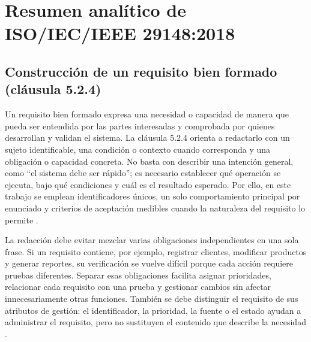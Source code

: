 \documentclass[11pt,a4paper]{article}
\begin{document}
\section{Resumen analítico de ISO/IEC/IEEE 29148:2018}

\subsection{Construcción de un requisito bien formado (cláusula 5.2.4)}
Un requisito bien formado expresa una necesidad o capacidad de manera que pueda ser entendida por las partes interesadas y comprobada por quienes desarrollan y validan el sistema. La cláusula 5.2.4 orienta a redactarlo con un sujeto identificable, una condición o contexto cuando corresponda y una obligación o capacidad concreta. No basta con describir una intención general, como “el sistema debe ser rápido”; es necesario establecer qué operación se ejecuta, bajo qué condiciones y cuál es el resultado esperado. Por ello, en este trabajo se emplean identificadores únicos, un solo comportamiento principal por enunciado y criterios de aceptación medibles cuando la naturaleza del requisito lo permite \cite{iso29148}.

La redacción debe evitar mezclar varias obligaciones independientes en una sola frase. Si un requisito contiene, por ejemplo, registrar clientes, modificar productos y generar reportes, su verificación se vuelve difícil porque cada acción requiere pruebas diferentes. Separar esas obligaciones facilita asignar prioridades, relacionar cada requisito con una prueba y gestionar cambios sin afectar innecesariamente otras funciones. También se debe distinguir el requisito de sus atributos de gestión: el identificador, la prioridad, la fuente o el estado ayudan a administrar el requisito, pero no sustituyen el contenido que describe la necesidad \cite{iso29148}.
\end{document}
